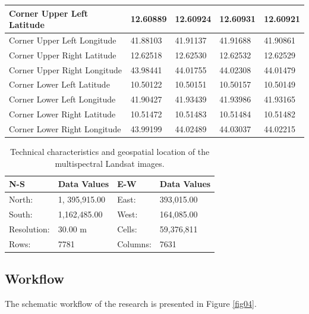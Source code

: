 \documentclass[jimaging,article,accept,pdftex,moreauthors]{Definitions/mdpi}
\begin{document}
\begin{table}[H]
\begin{tabular}{ l  l  l  l  l }
        Corner Upper Left Latitude & 12.60889 & 12.60924 & 12.60931 & 12.60921 \\ \midrule
        Corner Upper Left Longitude & 41.88103 & 41.91137 & 41.91688 & 41.90861 \\ \midrule
        Corner Upper Right Latitude & 12.62518 & 12.62530 & 12.62532 & 12.62529 \\ \midrule
        Corner Upper Right Longitude & 43.98441 & 44.01755 & 44.02308 & 44.01479 \\ \midrule
        Corner Lower Left Latitude & 10.50122 & 10.50151 & 10.50157 & 10.50149 \\ \midrule
        Corner Lower Left Longitude & 41.90427 & 41.93439 & 41.93986 & 41.93165 \\ \midrule
        Corner Lower Right Latitude & 10.51472 & 10.51483 & 10.51484 & 10.51482 \\ \midrule
        Corner Lower Right Longitude & 43.99199 & 44.02489 & 44.03037 & 44.02215 \\\bottomrule
    \end{tabular}
\end{table}

\vspace{-6pt}
\begin{table}[H]
\caption{Technical characteristics and geospatial location of the multispectral Landsat images.}\label{tab03}
\setlength\tabcolsep{0pt}
\begin{tabularx}{\textwidth}{ X X X X}
\toprule
\textbf{N-S} & \textbf{Data Values} & \textbf{E-W} & \textbf{Data Values}\\
\midrule
	North: & 1,%
395,915.00 &  East: & 393,015.00 \\
	South: &  1,162,485.00 &  West: & 164,085.00 \\
	Resolution: &  30.00 m & Cells: & 59,376,811 \\
	Rows: & 7781 & Columns: & 7631 \\
\bottomrule
\end{tabularx}
\end{table}

\subsection{Workflow}

{The schematic workflow of the research is presented in Figure} \ref{fig04}.
 
\end{document}
